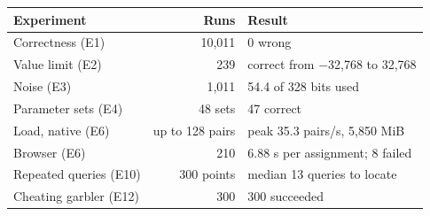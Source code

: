 \begin{tabular}{lrl}
\hline
Experiment & Runs & Result \\
\hline
Correctness (E1) & 10,011 & 0 wrong \\
Value limit (E2) & 239 & correct from $-$32,768 to 32,768 \\
Noise (E3) & 1,011 & 54.4 of 328 bits used \\
Parameter sets (E4) & 48 sets & 47 correct \\
Load, native (E6) & up to 128 pairs & peak 35.3 pairs/s, 5,850 MiB \\
Browser (E6) & 210 & 6.88 s per assignment; 8 failed \\
Repeated queries (E10) & 300 points & median 13 queries to locate \\
Cheating garbler (E12) & 300 & 300 succeeded \\
\hline
\end{tabular}
